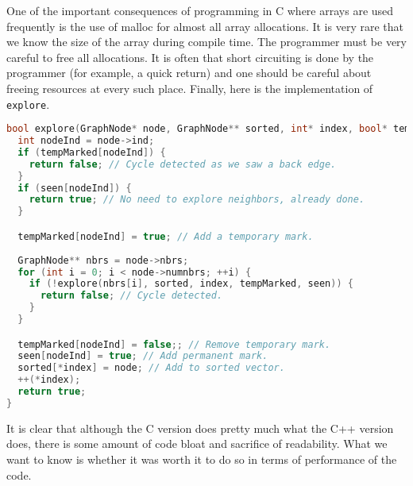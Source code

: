One of the important consequences of programming in C where arrays are used frequently is 
the use of malloc for almost all array allocations. It is very rare that we know the size 
of the array during compile time. The programmer must be very careful to free all allocations. 
It is often that short circuiting is done by the programmer (for example, a quick return) 
and one should be careful about freeing resources at every such place. Finally, here is the
implementation of \verb+explore+.
\begin{lstlisting}[language=c++]
bool explore(GraphNode* node, GraphNode** sorted, int* index, bool* tempMarked, bool* seen) {
  int nodeInd = node->ind;
  if (tempMarked[nodeInd]) {
    return false; // Cycle detected as we saw a back edge.
  }
  if (seen[nodeInd]) {
    return true; // No need to explore neighbors, already done.
  }

  tempMarked[nodeInd] = true; // Add a temporary mark.
  
  GraphNode** nbrs = node->nbrs;
  for (int i = 0; i < node->numnbrs; ++i) {
    if (!explore(nbrs[i], sorted, index, tempMarked, seen)) {
      return false; // Cycle detected.
    }
  }

  tempMarked[nodeInd] = false;; // Remove temporary mark.
  seen[nodeInd] = true; // Add permanent mark.
  sorted[*index] = node; // Add to sorted vector.
  ++(*index);
  return true;
}
\end{lstlisting}
It is clear that although the C version does pretty much what the C++ version does, there
is some amount of code bloat and sacrifice of readability. What we want to know is 
whether it was worth it to do so in terms of performance of the code. 

